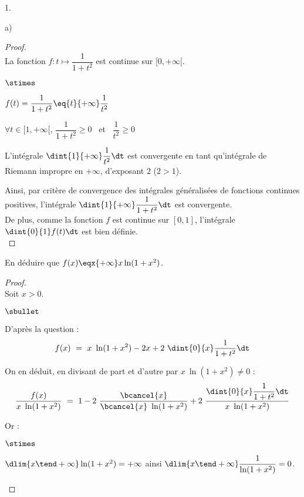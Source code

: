 \documentclass[11pt]{article}%
\begin{document}
\begin{noliste}{1.}
\begin{noliste}{a)}
    \begin{proof}~\\%
      La fonction $f : t \mapsto \dfrac{1}{1 + t^2}$ est continue sur
      $[0, +\infty[$.
      \begin{noliste}{$\stimes$}
      \item $f(t) = \dfrac{1}{1 + t^2} \eq{t}{+\infty}
        \dfrac{1}{t^2}$
        
      \item $\forall t \in [1, +\infty[$, $\dfrac{1}{1 + t^2} \geq
        0$ \ et \ $\dfrac{1}{t^2} \geq 0$
        
      \item L'intégrale $\dint{1}{+\infty} \dfrac{1}{t^2} \dt$ est
        convergente en tant qu'intégrale de Riemann impropre en
        $+\infty$, d'exposant $2$ ($2 > 1$).          
      \end{noliste}
      Ainsi, par critère de convergence des intégrales généralisées
      de fonctions continues positives, l'intégrale
      $\dint{1}{+\infty} \dfrac{1}{1+t^2} \dt$ est convergente.\\
      De plus, comme la fonction $f$ est continue sur $[0, 1]$,
      l'intégrale $\dint{0}{1} f(t) \dt$ est bien définie.%
      ~\\[-.8cm]
    \end{proof}
    
  \item En déduire que $f(x) \eqx{+\infty} x \ln(1 + x^2)$.

    \begin{proof}~\\%
      Soit $x > 0$.
      \begin{noliste}{$\sbullet$}
      \item D'après la question  :
        \[
        f(x) \ = \ x \ \ln(1 + x^2) - 2x + 2 \ \dint{0}{x} \dfrac{1}{1
          + t^2} \dt
        \]

      \item On en déduit, en divisant de part et d'autre par $x \
        \ln(1 + x^2) \neq 0$ :
        \[
        \dfrac{f(x)}{x \ \ln(1 + x^2)} \ = \ 1 - 2 \
        \dfrac{\bcancel{x}}{\bcancel{x} \ \ln(1 + x^2)} + 2 \
        \dfrac{\dint{0}{x} \dfrac{1}{1 + t^2} \dt}{x \ \ln(1 + x^2)}
        \]

      \item Or : 
        \begin{noliste}{$\stimes$}
        \item $\dlim{x \tend +\infty} \ln(1 + x^2) = +\infty$ ainsi
          $\dlim{x \tend +\infty} \dfrac{1}{\ln(1 + x^2)} = 0$.


\end{noliste}
\end{noliste}
\end{proof}
\end{noliste}
\end{noliste}
\end{document}
